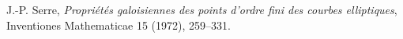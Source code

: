  J.-P. Serre, \emph{Propri\'et\'es galoisiennes des points
d'ordre fini des courbes elliptiques}, Inventiones Mathematicae 15
(1972), 259--331.
